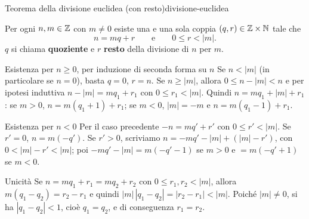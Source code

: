 \begin{concetto}
\begin{Teorema}{Teorema della divisione euclidea (con resto)}{divisione-euclidea}
    \begin{prerequisiti}
    \end{prerequisiti}
    Per ogni $n, m \in \mathbb{Z}$ con $m \neq 0$ esiste una e una sola coppia $(q, r) \in \mathbb{Z} \times \mathbb{N}$ tale che
    \[ n = mq + r \qquad\text{e}\qquad 0 \leq r < |m|. \]
    $q$ si chiama \textbf{quoziente} e $r$ \textbf{resto} della divisione di $n$ per $m$.
\end{Teorema}
\begin{dimostrazione}
    \begin{caso}{Esistenza per $n \geq 0$, per induzione di seconda forma su $n$}
        Se $n < |m|$ (in particolare se $n = 0$), basta $q = 0$, $r = n$. Se $n \geq |m|$, allora $0 \leq n - |m| < n$ e per ipotesi induttiva
        $n - |m| = mq_1 + r_1$ con $0 \leq r_1 < |m|$. Quindi $n = mq_1 + |m| + r_1$: se $m > 0$, $n = m(q_1 + 1) + r_1$; se $m < 0$, $|m| = -m$ e
        $n = m(q_1 - 1) + r_1$.
    \end{caso}
    \begin{caso}{Esistenza per $n < 0$}
        Per il caso precedente $-n = mq' + r'$ con $0 \leq r' < |m|$. Se $r' = 0$, $n = m(-q')$. Se $r' > 0$, scriviamo
        $n = -mq' - |m| + (|m| - r')$, con $0 < |m| - r' < |m|$; poi $-mq' - |m| = m(-q' - 1)$ se $m > 0$ e $= m(-q' + 1)$ se $m < 0$.
    \end{caso}
    \begin{caso}{Unicità}
        Se $n = mq_1 + r_1 = mq_2 + r_2$ con $0 \leq r_1, r_2 < |m|$, allora $m(q_1 - q_2) = r_2 - r_1$ e quindi $|m|\,|q_1 - q_2| = |r_2 - r_1| < |m|$.
        Poiché $|m| \neq 0$, si ha $|q_1 - q_2| < 1$, cioè $q_1 = q_2$, e di conseguenza $r_1 = r_2$.
    \end{caso}
\end{dimostrazione}
\end{concetto}

